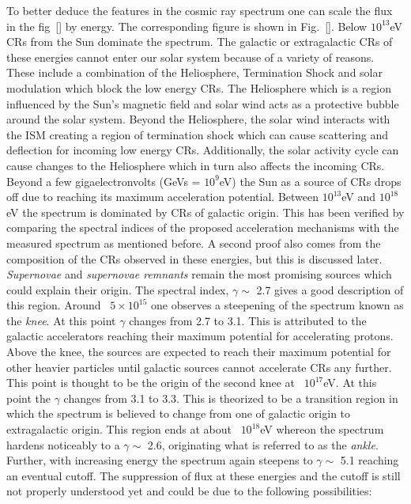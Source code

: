 To better deduce the features in the cosmic ray spectrum one can scale the flux in the fig~\ref{} by energy. The corresponding figure is shown in Fig.~\ref{}. Below $10^{13}$eV CRs from the Sun dominate the spectrum. The galactic or extragalactic CRs of these energies cannot enter our solar system because of a variety of reasons. These include a combination of the Heliosphere, Termination Shock and solar modulation which block the low energy CRs. The Heliosphere which is a region influenced by the Sun's magnetic field and solar wind acts as a protective bubble around the solar system. Beyond the Heliosphere, the solar wind interacts with the ISM creating a region of termination shock which can cause scattering and deflection for incoming low energy CRs. Additionally, the solar activity cycle can cause changes to the Heliosphere which in turn also affects the incoming CRs. Beyond a few gigaelectronvolts (GeVs = $10^{9}$eV) the Sun as a source of CRs drops off due to reaching its maximum acceleration potential. Between $10^{13}$eV and $10^{18}$eV the spectrum is dominated by CRs of galactic origin. This has been verified by comparing the spectral indices of the proposed acceleration mechanisms with the measured spectrum as mentioned before. A second proof also comes from the composition of the CRs observed in these energies, but this is discussed later. \textit{Supernovae} and \textit{supernovae remnants} remain the most promising sources which could explain their origin. The spectral index, $\gamma \sim$ 2.7 gives a good description of this region. Around ~$5 \times 10^{15}$ one observes a steepening of the spectrum known as the \textit{knee}. At this point $\gamma$ changes from 2.7 to 3.1. This is attributed to the galactic accelerators reaching their maximum potential for accelerating protons. Above the knee, the sources are expected to reach their maximum potential for other heavier particles until galactic sources cannot accelerate CRs any further. This point is thought to be the origin of the second knee at ~$10^{17}$eV. At this point the $\gamma$ changes from 3.1 to 3.3. This is theorized to be a transition region in which the spectrum is believed to change from one of galactic origin to extragalactic origin. This region ends at about ~$10^{18}$eV whereon the spectrum hardens noticeably to a $\gamma \sim$ 2.6, originating what is referred to as the \textit{ankle}. Further, with increasing energy the spectrum again steepens to $\gamma \sim$ 5.1 reaching an eventual cutoff. The suppression of flux at these energies and the cutoff is still not properly understood yet and could be due to the following possibilities:


